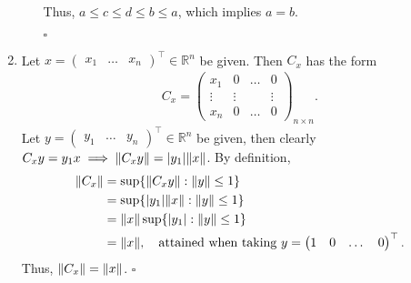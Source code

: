 \documentclass{article}
\begin{document}
\begin{enumerate}
\begin{itemize}
		Thus, $a \leq c \leq d \leq b \leq a$, which implies $a = b$.
		
		\hfill $\square$
	\end{itemize}
	
	
	\item Let ${x} = \begin{pmatrix}
	x_1 & \dots & x_n
	\end{pmatrix}^\top \in \mathbb{R}^n$ be given. Then $C_x$ has the form
	\begin{align*}
	C_x = \begin{pmatrix}
	x_1 & 0 & \dots & 0\\
	\vdots & \vdots &  & \vdots\\
	x_n & 0 & \dots & 0
	\end{pmatrix}_{n\times n}.
	\end{align*} 
	Let ${y} = \begin{pmatrix}
	y_1 & \dots & y_n
	\end{pmatrix}^\top \in \mathbb{R}^n$ be given, then clearly $C_x {y} = y_1 {x} \implies \norm{ C_xy } = | y_1 | \norm{ x}$. By definition, 
	\begin{align*}
	\norm{ C_x } &= \sup \{\norm{ C_x y } : \norm{ y } \leq 1\}\nonumber\\
	&= \sup \{|y_1| \norm{x} :\norm{y} \leq 1\}\nonumber\\
	&= \norm{x}\sup \{|y_1|:\norm{y} \leq 1\}\nonumber\\
	&= \norm{x}, \quad \text{attained when taking } y = \begin{pmatrix}
	1 & 0 & \dots & 0
	\end{pmatrix}^\top.
	\end{align*}
	Thus, $\norm{C_x} = \norm{x}$. 
	\hfill $\square$
	

	
	
	
	

\end{enumerate}
\end{document}
